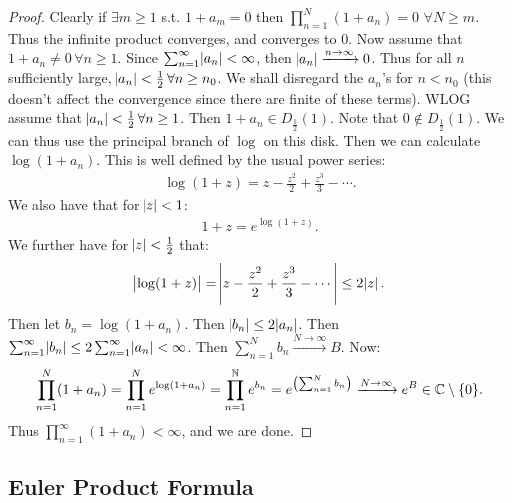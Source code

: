 \begin{proof}
Clearly if $\exists m \geq 1 $ s.t. $1+a_m = 0$ then $\prod_{n=1}^N(1+a_n) = 0 \, \, \forall N\geq m$. Thus the infinite product converges, and converges to $0$. Now assume that $1+a_n \neq 0 \, \forall n \geq 1$. Since $\sum_{n=1}^\infty \abs{a_n} < \infty$, then $\abs{a_n} \xrightarrow[]{n\to \infty } 0$. Thus for all $n$ sufficiently large, $\abs{a_n} < \frac{1}{2}\, \forall n \geq n_0$. We shall disregard the $a_n$'s for $n < n_0$ (this doesn't affect the convergence since there are finite of these terms). WLOG assume that $\abs{a_n} < \frac{1}{2} \, \forall n \geq 1$. Then $1+a_n \in D_\frac{1}{2}(1)$. Note that $0 \not\in D_\frac{1}{2}(1)$. We can thus use the principal branch of $\log$ on this disk. Then we can calculate $\log(1+a_n)$. This is well defined by the usual power series:
\begin{align*}
    \log(1+z) = z - \frac{z^2}{2} + \frac{z^3}{3} - \cdots.
\end{align*}
We also have that for $\abs{z}< 1$:
\begin{align*}
    1+z = e^{\log(1+z)}.
\end{align*}
We further have for $\abs{z} < \frac{1}{2}$ that:
\begin{align*}
    \abs{\log(1+z)} = \abs{z - \frac{z^2}{2} + \frac{z^3}{3} - \cdots} \leq  2 \abs{z}.
\end{align*}
Then let $b_n = \log(1+a_n)$. Then $\abs{b_n} \leq 2 \abs{a_n}$. Then $\sum_{n=1}^\infty \abs{b_n} \leq 2 \sum_{n=1}^\infty \abs{a_n} < \infty$. Then $\sum_{n=1}^N b_n \xrightarrow[]{N \to \infty} B$. Now:
\begin{align*}
    \prod_{n=1}^N (1+a_n) = \prod_{n=1}^N e^{\log(1+a_n)} = \prod_{n=1}^{\mathbb{N}} e^{b_n} = e^{ \left( \sum_{n=1}^N b_n \right)} \xrightarrow{N \to \infty} e^B \in \mathbb{C} \setminus \{0 \}.
\end{align*}
Thus $\prod_{n=1}^\infty (1+a_n) < \infty$, and we are done.



\end{proof}

\subsection{Euler Product Formula}

